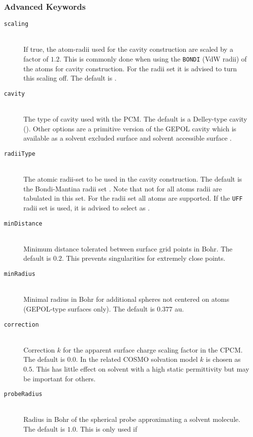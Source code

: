 \subsubsection{Advanced Keywords}
\begin{description}
    \item [\texttt{scaling}]\hfill \\
    If true, the atom-radii used for the cavity construction are scaled by a factor of $1.2$. This is commonly done 
    when using the \texttt{BONDI} (VdW radii) of the atoms for cavity construction. For the  radii set it is 
    advised to turn this scaling off. The default is .
    \item [\texttt{cavity}]\hfill \\
    The type of cavity used with the PCM. The default is a Delley-type cavity (). Other options are 
    a primitive version of the GEPOL cavity which is available as a solvent excluded surface  and 
    solvent accessible surface .
    \item [\texttt{radiiType}]\hfill \\
    The atomic radii-set to be used in the cavity construction. The default is the Bondi-Mantina radii set .
    Note that not for all atoms radii are tabulated in this set. For the  radii set all atoms are supported.
    If the \texttt{UFF} radii set is used, it is advised to select  as .
    \item [\texttt{minDistance}]\hfill \\
    Minimum distance tolerated between surface grid points in Bohr. The default is $0.2$. This prevents singularities
    for extremely close points.
    \item [\texttt{minRadius}]\hfill \\
    Minimal radius in Bohr for additional spheres not centered on atoms (GEPOL-type surfaces only). The default is $0.377$ au.
    \item [\texttt{correction}]\hfill \\
    Correction $k$ for the apparent surface charge scaling factor in the CPCM. The default is $0.0$. In the related 
    COSMO solvation model $k$ is chosen as $0.5$. This has little effect on solvent with a high static permittivity
    but may be important for others.
    \item [\texttt{probeRadius}]\hfill \\
    Radius in Bohr of the spherical probe approximating a solvent molecule. The default is $1.0$. This is only used if

\end{description}
